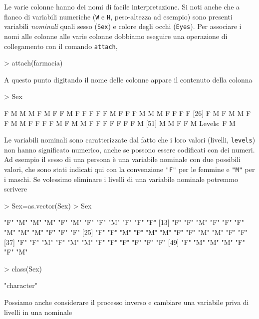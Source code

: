 \documentclass[onecolumn,12pt]{book}
\begin{document}
Le varie colonne hanno dei nomi di facile interpretazione. Si noti anche che a fianco di variabili numeriche (\texttt{W} e \texttt{H}, peso-altezza ad esempio) sono presenti variabili  \emph {nominali} quali sesso (\texttt{Sex}) e colore degli occhi (\texttt{Eyes}).
Per associare i nomi alle colonne  alle varie colonne dobbiamo eseguire una operazione di collegamento con il comando \texttt{attach},
\begin{Schunk}
\begin{Sinput}
> attach(farmacia)
\end{Sinput}
\end{Schunk}
A questo punto digitando il nome delle colonne appare il contenuto della colonna
\begin{Schunk}
\begin{Sinput}
> Sex
\end{Sinput}
\begin{Soutput}
 [1] F M M M F M F F M F F F F F M F F F M M M F F F F
[26] F M F M M F F M M F F F F M F M M F F F F F F F M
[51] M M F F M
Levels: F M
\end{Soutput}
\end{Schunk}
Le variabili nominali sono caratterizzate dal fatto che i loro valori (livelli, \texttt{levels})  non hanno significato numerico, anche se possono essere codificati con dei numeri.   Ad esempio il sesso di una persona \`e una variabile nominale con due possibili valori, che sono stati  indicati qui con la convenzione  \texttt{"F"}  per le femmine e \texttt{"M"} per i maschi.  Se volessimo eliminare i livelli di una variabile nominale potremmo scrivere
\begin{Schunk}
\begin{Sinput}
> Sex=as.vector(Sex)
> Sex
\end{Sinput}
\begin{Soutput}
 [1] "F" "M" "M" "M" "F" "M" "F" "F" "M" "F" "F" "F"
[13] "F" "F" "M" "F" "F" "F" "M" "M" "M" "F" "F" "F"
[25] "F" "F" "M" "F" "M" "M" "F" "F" "M" "M" "F" "F"
[37] "F" "F" "M" "F" "M" "M" "F" "F" "F" "F" "F" "F"
[49] "F" "M" "M" "M" "F" "F" "M"
\end{Soutput}
\begin{Sinput}
> class(Sex)
\end{Sinput}
\begin{Soutput}
[1] "character"
\end{Soutput}
\end{Schunk}
Possiamo anche considerare il processo inverso e cambiare una variabile priva di livelli in una nominale
\end{document}
